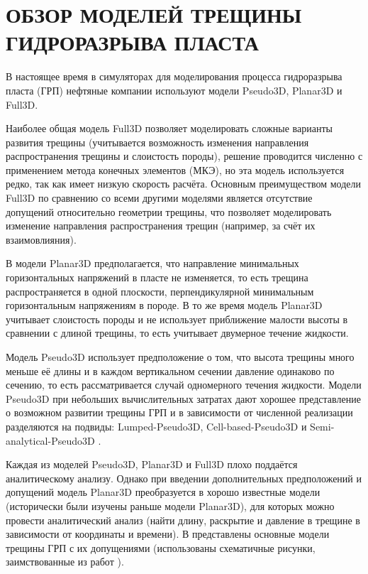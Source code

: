 \chapter{ОБЗОР МОДЕЛЕЙ ТРЕЩИНЫ ГИДРОРАЗРЫВА ПЛАСТА} \label{ch1}

В настоящее время в симуляторах для моделирования процесса гидроразрыва пласта (ГРП) нефтяные компании используют модели Pseudo3D, Planar3D и Full3D.

Наиболее общая модель Full3D позволяет моделировать сложные варианты развития трещины (учитывается возможность изменения направления распространения трещины и слоистость породы), решение проводится численно с применением метода конечных элементов (МКЭ), но эта модель используется редко, так как имеет низкую скорость расчёта.
Основным преимуществом модели Full3D по сравнению со всеми другими моделями является отсутствие допущений относительно геометрии трещины, что позволяет моделировать изменение направления распространения трещин (например, за счёт их взаимовлияния).

В модели Planar3D предполагается, что направление минимальных горизонтальных напряжений в пласте не изменяется, то есть трещина распространяется в одной плоскости, перпендикулярной минимальным горизонтальным напряжениям в породе.
В то же время модель Planar3D учитывает слоистость породы и не использует приближение малости высоты в сравнении с длиной трещины, то есть учитывает двумерное течение жидкости.

Модель Pseudo3D использует предположение о том, что высота трещины много меньше её длины и в каждом вертикальном сечении давление одинаково по сечению, то есть рассматривается случай одномерного течения жидкости.
Модели Pseudo3D при небольших вычислительных затратах дают хорошее представление о возможном развитии трещины ГРП и в зависимости от численной реализации разделяются на подвиды: Lumped-Pseudo3D, Cell-based-Pseudo3D \cite{adachi} и Semi-analytical-Pseudo3D \cite{shel_paderin}.

Каждая из моделей Pseudo3D, Planar3D и Full3D плохо поддаётся аналитическому анализу.
Однако при введении дополнительных предположений и допущений модель Planar3D преобразуется в хорошо известные модели (исторически были изучены раньше модели Planar3D), для которых можно провести аналитический анализ (найти длину, раскрытие и давление в трещине в зависимости от координаты и времени).
В  представлены основные модели трещины ГРП с их допущениями (использованы схематичные рисунки, заимствованные из работ \cite{valov_baykin_dontsov, baykin_course, adachi, dontsov_peirce}).

